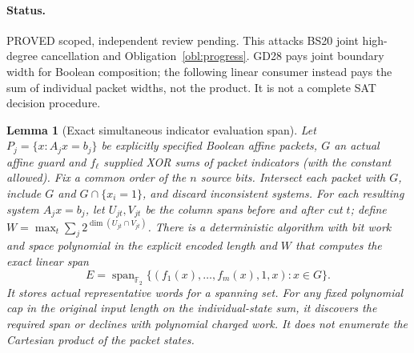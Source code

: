 \documentclass[11pt]{article}
\newtheorem{lemma}[theorem]{Lemma}
\begin{document}
\paragraph{Status.} PROVED scoped, independent review pending. This attacks BS20 joint high-degree cancellation and Obligation~\ref{obl:progress}. GD28 pays joint boundary width for Boolean composition; the following linear consumer instead pays the sum of individual packet widths, not the product. It is not a complete SAT decision procedure.
\begin{lemma}[Exact simultaneous indicator evaluation span]\label{lem:da21-span}
Let $P_j=\{x:A_jx=b_j\}$ be explicitly specified Boolean affine packets, $G$ an actual affine guard and $f_\ell$ supplied XOR sums of packet indicators (with the constant allowed). Fix a common order of the $n$ source bits. Intersect each packet with $G$, include $G$ and $G\cap\{x_i=1\}$, and discard inconsistent systems. For each resulting system $A_jx=b_j$, let $U_{jt},V_{jt}$ be the column spans before and after cut $t$; define $W=\max_t\sum_j2^{\dim(U_{jt}\cap V_{jt})}$. There is a deterministic algorithm with bit work and space polynomial in the explicit encoded length and $W$ that computes the exact linear span
\[
E=\operatorname{span}_{\mathbb F_2}\{(f_1(x),\ldots,f_m(x),1,x):x\in G\}.
\]
It stores actual representative words for a spanning set. For any fixed polynomial cap in the original input length on the individual-state sum, it discovers the required span or declines with polynomial charged work. It does not enumerate the Cartesian product of the packet states.
\end{lemma}
\end{document}
